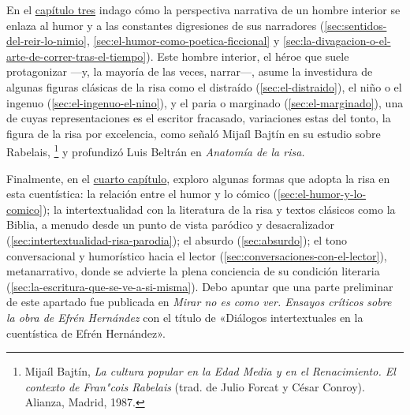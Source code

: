 \documentclass[14pt,twoside,final]{extbook} %
\let\oldfootnote\footnote
\renewcommand\footnote[1]{%
\oldfootnote{\hspace{1mm}#1}}
\begin{document}
En el \hyperref[ch:figuras-de-la-risa-en-la-cuentistica-de-hernandez]{capítulo tres} indago cómo la perspectiva narrativa de un hombre interior se enlaza al humor y a las constantes digresiones de sus narradores (\autoref{sec:sentidos-del-reir-lo-nimio}, \autoref{sec:el-humor-como-poetica-ficcional} y \autoref{sec:la-divagacion-o-el-arte-de-correr-tras-el-tiempo}). Este hombre interior, el héroe que suele protagonizar ---y, la mayoría de las veces, narrar---, asume la investidura de algunas figuras clásicas de la risa como el distraído (\autoref{sec:el-distraido}), el niño o el ingenuo (\autoref{sec:el-ingenuo-el-nino}), y el paria o marginado (\autoref{sec:el-marginado}), una de cuyas representaciones es el escritor fracasado, variaciones estas del tonto, la figura de la risa por excelencia, como señaló Mijaíl Bajtín en su estudio sobre Rabelais,\footnote{Mijaíl Bajtín, \emph{La cultura popular en la Edad Media y en el Renacimiento. El contexto de Fran"cois Rabelais} (trad. de Julio Forcat y César Conroy). Alianza, Madrid, 1987.} y profundizó Luis Beltrán en \emph{Anatomía de la risa.}

Finalmente, en el \hyperref[ch:tonos-y-giros-de-la-risa-hernandeana]{cuarto capítulo}, exploro algunas formas que adopta la risa en esta cuentística: la relación entre el humor y lo cómico (\autoref{sec:el-humor-y-lo-comico}); la intertextualidad con la literatura de la risa y textos clásicos como la Biblia, a menudo desde un punto de vista paródico y desacralizador (\autoref{sec:intertextualidad-risa-parodia}); el absurdo (\autoref{sec:absurdo}); el tono conversacional y humorístico hacia el lector (\autoref{sec:conversaciones-con-el-lector}), metanarrativo, donde se advierte la plena conciencia de su condición literaria (\autoref{sec:la-escritura-que-se-ve-a-si-misma}). Debo apuntar que una parte preliminar de este apartado fue publicada en \emph{Mirar no es como ver. Ensayos críticos sobre la obra de Efrén Hernández} con el título de «Diálogos intertextuales en la cuentística de Efrén Hernández».
\end{document}
